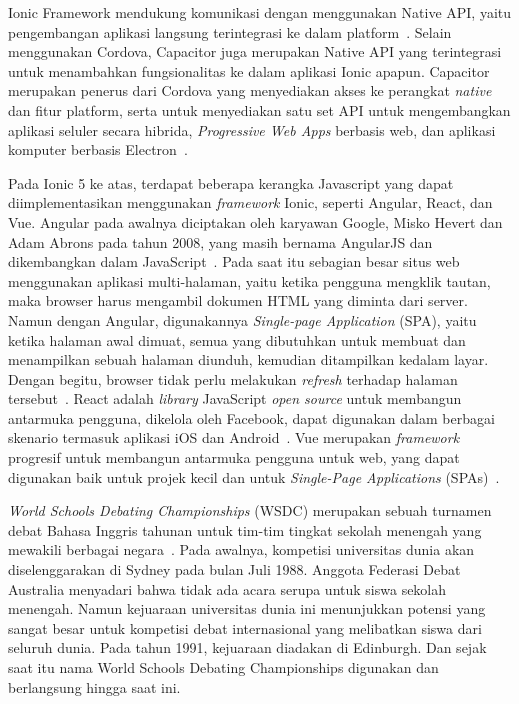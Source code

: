 Ionic Framework mendukung komunikasi dengan menggunakan Native API, yaitu pengembangan aplikasi langsung terintegrasi ke dalam platform~\cite{griffith:17:mobile}. Selain menggunakan Cordova, Capacitor juga merupakan Native API yang terintegrasi untuk menambahkan fungsionalitas ke dalam aplikasi Ionic apapun. Capacitor merupakan penerus dari Cordova yang menyediakan akses ke perangkat {\it native} dan fitur platform, serta untuk menyediakan satu set API untuk mengembangkan aplikasi seluler secara hibrida, {\it Progressive Web Apps} berbasis web, dan aplikasi komputer berbasis Electron~\cite{tor:19:software}.

Pada Ionic 5 ke atas, terdapat beberapa kerangka Javascript yang dapat diimplementasikan menggunakan \textit{framework} Ionic, seperti Angular, React, dan Vue. Angular pada awalnya diciptakan oleh karyawan Google, Misko Hevert dan Adam Abrons pada tahun 2008, yang masih bernama AngularJS dan dikembangkan dalam JavaScript~\cite{wohlgethan:18:supporting}. Pada saat itu sebagian besar situs web menggunakan aplikasi multi-halaman, yaitu ketika pengguna mengklik tautan, maka browser harus mengambil dokumen HTML yang diminta dari server. Namun dengan Angular, digunakannya \textit{Single-page Application} (SPA), yaitu ketika halaman awal dimuat, semua yang dibutuhkan untuk membuat dan menampilkan sebuah halaman diunduh, kemudian ditampilkan kedalam layar. Dengan begitu, browser tidak perlu melakukan \textit{refresh} terhadap halaman tersebut~\cite{scott:15:spa}. React adalah \textit{library} JavaScript {\it open source} untuk membangun antarmuka pengguna, dikelola oleh Facebook, dapat digunakan dalam berbagai skenario termasuk aplikasi iOS dan Android~\cite{wohlgethan:18:supporting}. Vue merupakan \textit{framework} progresif untuk membangun antarmuka pengguna untuk web, yang dapat digunakan baik untuk projek kecil dan untuk {\it Single-Page Applications} (SPAs)~\cite{wohlgethan:18:supporting}.

\textit{World Schools Debating Championships} (WSDC) merupakan sebuah turnamen debat Bahasa Inggris tahunan untuk tim-tim tingkat sekolah menengah yang mewakili berbagai negara~\cite{wsdc}. Pada awalnya, kompetisi universitas dunia akan diselenggarakan di Sydney pada bulan Juli 1988. Anggota Federasi Debat Australia menyadari bahwa tidak ada acara serupa untuk siswa sekolah menengah. Namun kejuaraan universitas dunia ini menunjukkan potensi yang sangat besar untuk kompetisi debat internasional yang melibatkan siswa dari seluruh dunia. Pada tahun 1991, kejuaraan diadakan di Edinburgh. Dan sejak saat itu nama World Schools Debating Championships digunakan dan berlangsung hingga saat ini. 

